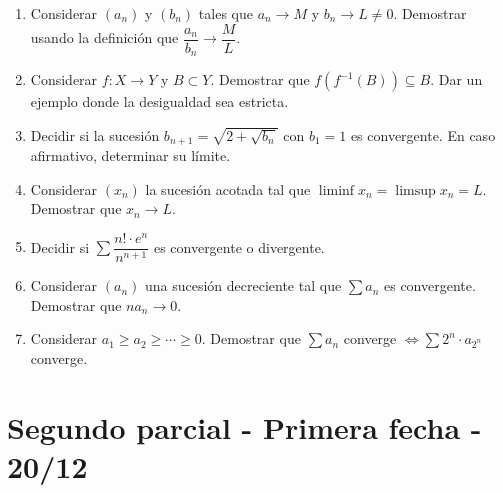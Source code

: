 \begin{enumerate}
  \item Considerar $(a_n)$ y $(b_n)$ tales que $a_n \to M$ y $b_n \to L \neq 0$. Demostrar usando la definición que $\dfrac{a_n}{b_n} \to \dfrac{M}{L}$.
  \item Considerar $f: X \to Y$ y $B \subset Y$. Demostrar que $f(f^{-1}(B)) \subseteq B$. Dar un ejemplo donde la desigualdad sea estricta.
  \item Decidir si la sucesión $b_{n+1} = \sqrt{2 + \sqrt{b_n}}$ con $b_1 = 1$ es convergente. En caso afirmativo, determinar su límite.
  \item Considerar $(x_n)$ la sucesión acotada tal que $\liminf x_n = \limsup x_n = L$. Demostrar que $x_n \to L$.
  \item Decidir si $\sum \dfrac{n! \cdot e^n}{n^{n+1}}$ es convergente o divergente.
  \item Considerar $(a_n)$ una sucesión decreciente tal que $\sum a_n$ es convergente. Demostrar que $n a_n \to 0$.
  \item Considerar $a_1 \geq a_2 \geq \cdots \geq 0$. Demostrar que $\sum a_n$ converge $\iff \sum 2^n \cdot a_{2^n}$ converge.
\end{enumerate}

\section{Segundo parcial - Primera fecha - 20/12}

